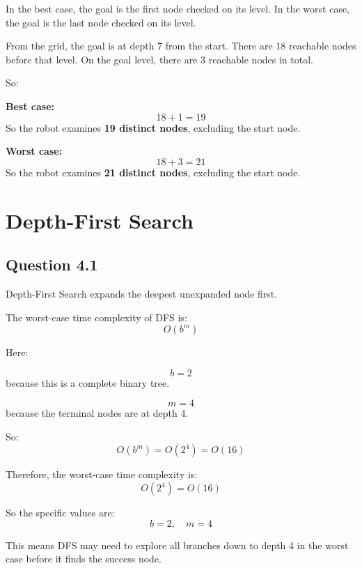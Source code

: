 \documentclass[paper=a4, fontsize=11pt]{scrartcl}
\begin{document}
In the best case, the goal is the first node checked on its level.  
In the worst case, the goal is the last node checked on its level.

From the grid, the goal is at depth 7 from the start.  
There are 18 reachable nodes before that level.  
On the goal level, there are 3 reachable nodes in total.

So:

\textbf{Best case:}
\[
18 + 1 = 19
\]
So the robot examines \textbf{19 distinct nodes}, excluding the start node.

\textbf{Worst case:}
\[
18 + 3 = 21
\]
So the robot examines \textbf{21 distinct nodes}, excluding the start node.

\section{Depth-First Search}

\subsection*{Question 4.1}
Depth-First Search expands the deepest unexpanded node first.

The worst-case time complexity of DFS is:
\[
O(b^m)
\]

Here:

\[
b = 2
\]
because this is a complete binary tree.

\[
m = 4
\]
because the terminal nodes are at depth 4.

So:
\[
O(b^m) = O(2^4) = O(16)
\]

Therefore, the worst-case time complexity is:
\[
\boxed{O(2^4) = O(16)}
\]

So the specific values are:
\[
b=2,\quad m=4
\]

This means DFS may need to explore all branches down to depth 4 in the worst case before it finds the success node.
\end{document}
